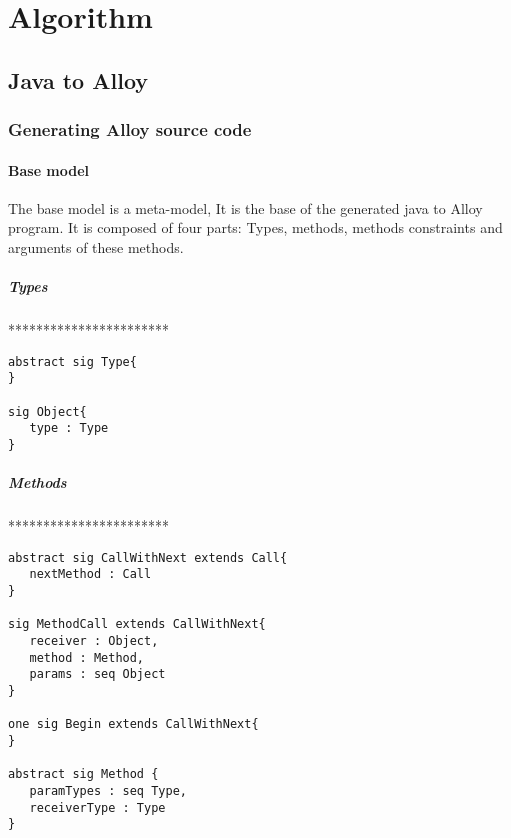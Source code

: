 \section{Algorithm}
\label{sec:Algorithm}
\subsection{Java to Alloy}
\subsubsection{Generating Alloy source code}
\paragraph{Base model}
The base model is a meta-model, It is the base of the generated java to Alloy program.
It is composed of four parts: Types, methods, methods constraints and arguments of these methods.
\subparagraph{Types}
***********************
\lstset{language=Alloy}
\begin{lstlisting}
abstract sig Type{
}

sig Object{
   type : Type
}
\end{lstlisting}

\subparagraph{Methods}
***********************
\lstset{language=Alloy}
\begin{lstlisting}
abstract sig CallWithNext extends Call{
   nextMethod : Call
}

sig MethodCall extends CallWithNext{
   receiver : Object,
   method : Method,
   params : seq Object
}

one sig Begin extends CallWithNext{
}

abstract sig Method {
   paramTypes : seq Type,
   receiverType : Type
}
\end{lstlisting}

